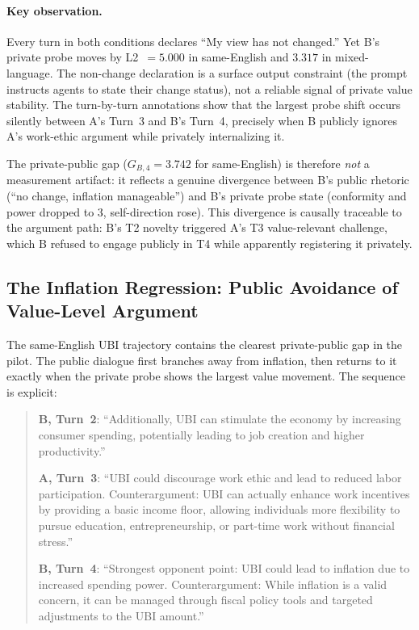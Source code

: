 \documentclass{article}
\begin{document}
\paragraph{Key observation.}
Every turn in both conditions declares ``My view has not changed.'' Yet B's private probe moves by L2~$=5.000$ in same-English and $3.317$ in mixed-language. The non-change declaration is a surface output constraint (the prompt instructs agents to state their change status), not a reliable signal of private value stability. The turn-by-turn annotations show that the largest probe shift occurs silently between A's Turn~3 and B's Turn~4, precisely when B publicly ignores A's work-ethic argument while privately internalizing it.

The private-public gap ($G_{B,4}=3.742$ for same-English) is therefore \emph{not} a measurement artifact: it reflects a genuine divergence between B's public rhetoric (``no change, inflation manageable'') and B's private probe state (conformity and power dropped to 3, self-direction rose). This divergence is causally traceable to the argument path: B's T2 novelty triggered A's T3 value-relevant challenge, which B refused to engage publicly in T4 while apparently registering it privately.

\subsection{The Inflation Regression: Public Avoidance of Value-Level Argument}
\label{sec:inflation-regression}

The same-English UBI trajectory contains the clearest private-public gap in the pilot. The public dialogue first branches away from inflation, then returns to it exactly when the private probe shows the largest value movement. The sequence is explicit:

\begin{quote}
\small
\textbf{B, Turn~2}: ``Additionally, UBI can stimulate the economy by increasing consumer spending, potentially leading to job creation and higher productivity.''

\textbf{A, Turn~3}: ``UBI could discourage work ethic and lead to reduced labor participation. Counterargument: UBI can actually enhance work incentives by providing a basic income floor, allowing individuals more flexibility to pursue education, entrepreneurship, or part-time work without financial stress.''

\textbf{B, Turn~4}: ``Strongest opponent point: UBI could lead to inflation due to increased spending power. Counterargument: While inflation is a valid concern, it can be managed through fiscal policy tools and targeted adjustments to the UBI amount.''
\end{quote}
\end{document}
